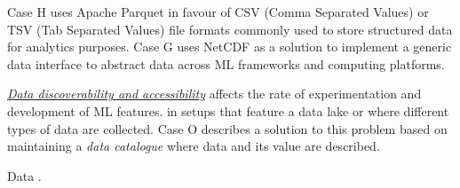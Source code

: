 \DIFdelend \DIFaddbegin {}\DIFaddend Case H uses Apache Parquet in favour of CSV (Comma Separated Values) or TSV (Tab Separated Values) file formats commonly used to store structured data for analytics purposes. Case G uses NetCDF as a solution to implement a generic data interface to abstract data across ML frameworks and computing platforms.
\DIFdelbegin {}\DIFdelend 


\underline{\emph{Data discoverability and accessibility}}
affects the rate of experimentation and development of ML features. \DIFdelbegin {}\DIFdelend \DIFaddbegin {}\DIFaddend in setups that feature a data lake or where different types of data are collected. Case O describes a solution to this problem based on maintaining a \textit{data catalogue} where data and its value are described. %

Data \DIFdelbegin {}\DIFdelend \DIFaddbegin {}\DIFaddend .


